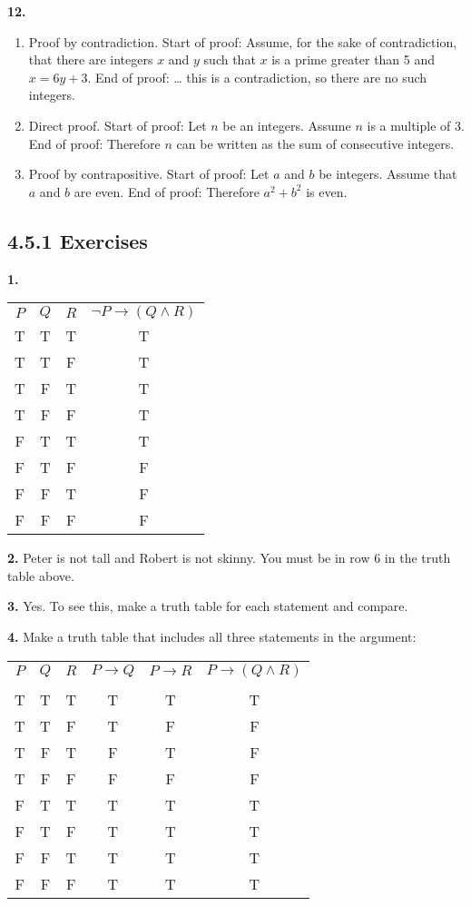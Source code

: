 \documentclass[10pt,]{book}
\theoremstyle{plain}
\theoremstyle{definition}
\theoremstyle{definition}
\theoremstyle{definition}
\numberwithin{equation}{chapter}
\newcommand{\hrulethin}  {\noalign{\hrule height 0.04em}}
\def\imp{\rightarrow}
\begin{document}
\par\smallskip
\noindent\textbf{12.}\quad{}\leavevmode%
\begin{enumerate}[label=(\alph*)]
\item\hypertarget{li-1116}{}
Proof by contradiction.  Start of proof: Assume, for the sake of contradiction, that there are integers \(x\) and \(y\) such that \(x\) is a prime greater than 5 and \(x = 6y + 3\).  End of proof: \dots{} this is a contradiction, so there are no such integers.
%
\item\hypertarget{li-1117}{}
Direct proof.  Start of proof: Let \(n\) be an integers.  Assume \(n\) is a multiple of 3.  End of proof: Therefore \(n\) can be written as the sum of consecutive integers.
%
\item\hypertarget{li-1118}{}
Proof by contrapositive.  Start of proof: Let \(a\) and \(b\) be integers.  Assume that \(a\) and \(b\) are even.  End of proof: Therefore \(a^2 + b^2\) is even.
%
\end{enumerate}
\par\smallskip
\subsection*{4.5.1 Exercises}
\noindent\textbf{1.}\quad{}\leavevmode%
\begin{table}
\centering
\begin{tabular}{cccc}
\(P\)&\(Q\)&\(R\)&\(\neg P \imp (Q \wedge R)\)\tabularnewline\hrulethin
T&T&T&T\tabularnewline[0pt]
T&T&F&T\tabularnewline[0pt]
T&F&T&T\tabularnewline[0pt]
T&F&F&T\tabularnewline[0pt]
F&T&T&T\tabularnewline[0pt]
F&T&F&F\tabularnewline[0pt]
F&F&T&F\tabularnewline[0pt]
F&F&F&F
\end{tabular}
\end{table}
\par\smallskip
\noindent\textbf{2.}\quad{}
            Peter is not tall and Robert is not skinny. You must be in row 6 in the truth table above.
\par\smallskip
\noindent\textbf{3.}\quad{}
            Yes. To see this, make a truth table for each statement and compare.
\par\smallskip
\noindent\textbf{4.}\quad{}
              Make
           a truth table that includes all three statements in the argument:
\leavevmode%
\begin{table}
\centering
\begin{tabular}{cccccc}
\(P\)&\(Q\)&\(R\)&\(P \imp Q\)&\(P \imp R\)&\(P \imp (Q \wedge R)\)\tabularnewline[0pt]
&&&&&\tabularnewline\hrulethin
T&T&T&T&T&T\tabularnewline[0pt]
T&T&F&T&F&F\tabularnewline[0pt]
T&F&T&F&T&F\tabularnewline[0pt]
T&F&F&F&F&F\tabularnewline[0pt]
F&T&T&T&T&T\tabularnewline[0pt]
F&T&F&T&T&T\tabularnewline[0pt]
F&F&T&T&T&T\tabularnewline[0pt]
F&F&F&T&T&T
\end{tabular}
\end{table}
\par
\end{document}
